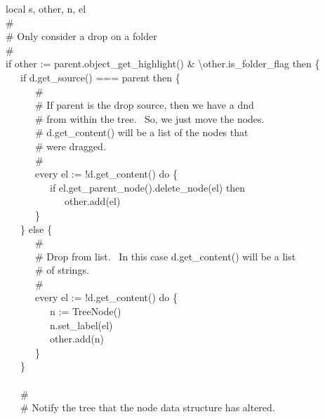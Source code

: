 {\>   \ \ \ local s, other, n, el \\
\>   \ \ \ \# \\
\>   \ \ \ \# Only consider a drop on a folder \\
\>   \ \ \ \# \\
\>   \ \ \ if other := parent.object\_get\_highlight() \&
{\textbackslash}other.is\_folder\_flag then \{ \\
\>   \ \ \ \ \ \ if d.get\_source() === parent then \{ \\
\>   \ \ \ \ \ \ \ \ \ \# \\
\>   \ \ \ \ \ \ \ \ \ \# If parent is the drop source, then we have a
dnd \\
\>   \ \ \ \ \ \ \ \ \ \# from within the tree. \ So, we just move the
nodes. \\
\>   \ \ \ \ \ \ \ \ \ \# d.get\_content() will be a list of the nodes
that \\
\>   \ \ \ \ \ \ \ \ \ \# were dragged. \\
\>   \ \ \ \ \ \ \ \ \ \# \\
\>   \ \ \ \ \ \ \ \ \ every el := !d.get\_content() do \{ \\
\>   \ \ \ \ \ \ \ \ \ \ \ \ if el.get\_parent\_node().delete\_node(el)
then \\
\>   \ \ \ \ \ \ \ \ \ \ \ \ \ \ \ other.add(el) \\
\>   \ \ \ \ \ \ \ \ \ \} \\
\>   \ \ \ \ \ \ \} else \{ \\
\>   \ \ \ \ \ \ \ \ \ \# \\
\>   \ \ \ \ \ \ \ \ \ \# Drop from list. \ In this case d.get\_content() will be a list\\
\>   \ \ \ \ \ \ \ \ \ \# of strings. \\
\>   \ \ \ \ \ \ \ \ \ \# \\
\>   \ \ \ \ \ \ \ \ \ every el := !d.get\_content() do \{ \\
\>   \ \ \ \ \ \ \ \ \ \ \ \ n := TreeNode() \\
\>   \ \ \ \ \ \ \ \ \ \ \ \ n.set\_label(el) \\
\>   \ \ \ \ \ \ \ \ \ \ \ \ other.add(n) \\
\>   \ \ \ \ \ \ \ \ \ \} \\
\>   \ \ \ \ \ \ \} \\
\ \\
\>   \ \ \ \ \ \ \# \\
\>   \ \ \ \ \ \ \# Notify the tree that the node data structure has altered. \\
}
